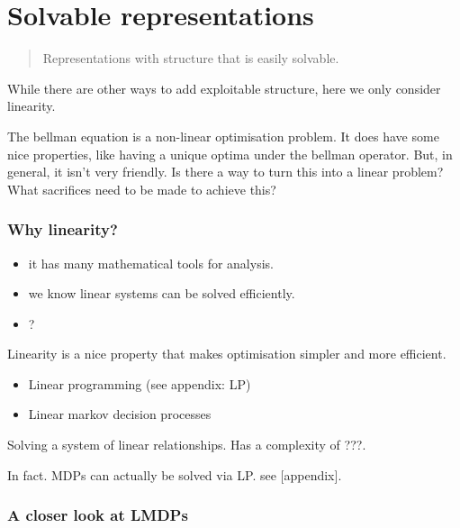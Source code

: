 \hypertarget{solveble-representations}{%
\section{Solvable representations}\label{solvable-representations}}

\begin{quote}
Representations with structure that is easily solvable.
\end{quote}

While there are other ways to add exploitable structure, here we only
consider linearity.

The bellman equation is a non-linear optimisation problem. It does have
some nice properties, like having a unique optima under the bellman
operator. But, in general, it isn't very friendly. Is there a way to
turn this into a linear problem? What sacrifices need to be made to
achieve this?

\hypertarget{why-linearity}{%
\subsubsection{Why linearity?}\label{why-linearity}}

\begin{itemize}
\tightlist
\item
  it has many mathematical tools for analysis.
\item
  we know linear systems can be solved efficiently.
\item
  ?
\end{itemize}

Linearity is a nice property that makes optimisation simpler and more
efficient.

\begin{itemize}
\tightlist
\item
  Linear programming (see appendix: LP)
\item
  Linear markov decision processes
\end{itemize}

Solving a system of linear relationships. Has a complexity of ???.

In fact. MDPs can actually be solved via LP. see {[}appendix{]}.

\hypertarget{a-closer-look-at-lmdps}{%
\subsubsection{A closer look at LMDPs}\label{a-closer-look-at-lmdps}}

